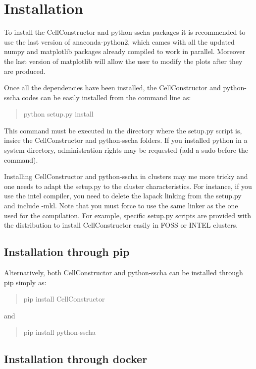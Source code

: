\documentclass[]{report}
\begin{document}
\section{Installation}
To install the CellConstructor and python-sscha packages it is recommended to use the last version of anaconda-python2, which cames with all the updated numpy and matplotlib packages already compiled to work in parallel. Moreover the last version of matplotlib will allow the user to modify the plots after they are produced.

Once all the dependencies have been installed, the CellConstructor and python-sscha codes can be easily installed from the command line as:

\begin{quotation}
	python setup.py install
\end{quotation}

This command must be executed in the directory where the setup.py script is, insice the CellConstructor and python-sscha folders. If you installed python in a system directory, administration rights may be requested (add a sudo before the command).

Installing CellConstructor and python-sscha in clusters may me more tricky and one needs to adapt the setup.py to the cluster characteristics. For instance, if you use the intel compiler, you need to delete the lapack linking from the setup.py and include -mkl. Note that you must force to use the same linker as the one used for the compilation. For example, specific setup.py scripts are provided with the distribution to install CellConstructor easily in FOSS or INTEL clusters.
\subsection{Installation through pip}

Alternatively, both CellConstructor and python-sscha can be installed through pip simply as:

\begin{quotation}
	pip install CellConstructor
\end{quotation}

and

\begin{quotation}
	pip install python-sscha 
\end{quotation}

\subsection{Installation through docker}
\end{document}

